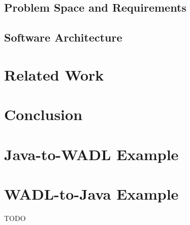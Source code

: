 \documentclass[a4paper,12pt]{article}
\begin{document}
\subsection{Problem Space and Requirements}


\subsection{Software Architecture}


\section{Related Work}


\section{Conclusion}


\newpage

\appendix

\section{Java-to-WADL Example}


\newpage

\section{WADL-to-Java Example}

TODO

\newpage


\end{document}
